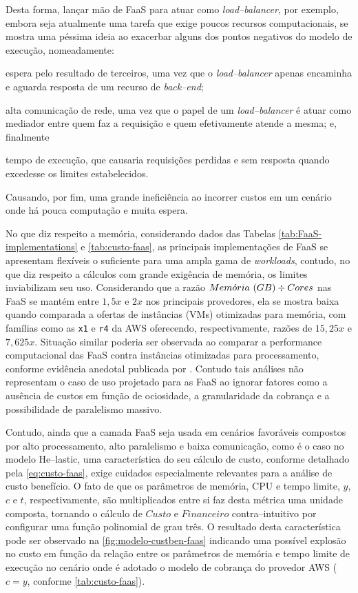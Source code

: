 \documentclass[english,brazilian]{UNISINOSmonografia} %
\begin{document}
Desta forma, lançar mão de FaaS para atuar como \textit{load--balancer}, por exemplo, embora seja atualmente uma tarefa que exige poucos recursos computacionais, se mostra uma péssima ideia ao exacerbar alguns dos pontos negativos do modelo de execução, nomeadamente:
\begin{inparaenum}
	\item espera pelo resultado de terceiros, uma vez que o \textit{load--balancer} apenas encaminha e aguarda resposta de um recurso de \textit{back--end};
	~
	\item alta comunicação de rede, uma vez que o papel de um \textit{load--balancer} é atuar como mediador entre quem faz a requisição e quem efetivamente atende a mesma; e, finalmente
	~
	\item tempo de execução, que causaria requisições perdidas e sem resposta quando excedesse os limites estabelecidos.
\end{inparaenum}
Causando, por fim, uma grande ineficiência ao incorrer custos em um cenário onde há pouca computação e muita espera.


No que diz respeito a memória, considerando dados das Tabelas \ref{tab:FaaS-implementations} e \ref{tab:custo-faas}, as principais implementações de FaaS se apresentam flexíveis o suficiente para uma ampla gama de \textit{workloads}, contudo, no que diz respeito a cálculos com grande exigência de memória, os limites inviabilizam seu uso.
Considerando que a razão $ Mem\acute{o}ria~{\small (GB)} \div Cores $ nas FaaS se mantém entre $ 1,5x $ e $ 2x $ nos principais provedores, ela se mostra baixa quando comparada a ofertas de instâncias (VMs) otimizadas para memória, com famílias como as \texttt{x1} e \texttt{r4} da AWS oferecendo, respectivamente, razões de $15,25x$ e $7,625x$.
Situação similar poderia ser observada ao comparar a performance computacional das FaaS contra instâncias otimizadas para processamento, conforme evidência anedotal publicada por \cite{CloudABC}.
Contudo tais análises não representam o caso de uso projetado para as FaaS ao ignorar fatores como a ausência de custos em função de ociosidade, a granularidade da cobrança e a possibilidade de paralelismo massivo.


Contudo, ainda que a camada FaaS seja usada em cenários favoráveis compostos por alto processamento, alto paralelismo e baixa comunicação, como é o caso no modelo \textsf{He}--lastic, uma característica do seu cálculo de custo, conforme detalhado pela \autoref{eq:custo-faas}, exige cuidados especialmente relevantes para a análise de custo benefício.
O fato de que os parâmetros de memória, CPU e tempo limite, $y$, $c$ e $t$, respectivamente, são multiplicados entre si faz desta métrica uma unidade composta, tornando o cálculo de $ Custo $ e $ Financeiro $ contra--intuitivo por configurar uma função polinomial de grau três.
O resultado desta característica pode ser observado na \autoref{fig:modelo-custben-faas} indicando uma possível explosão no custo em função da relação entre os parâmetros de memória e tempo limite de execução no cenário onde é adotado o modelo de cobrança do provedor AWS ($ c = y $, conforme \autoref{tab:custo-faas}).
\end{document}
